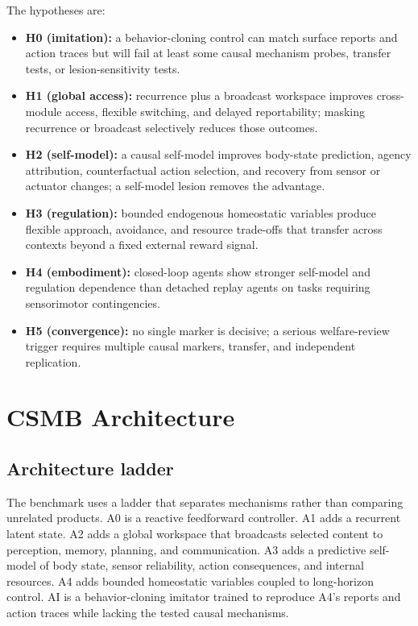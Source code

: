 \documentclass[conference]{IEEEtran}
\begin{document}
The hypotheses are:

\begin{itemize}
\item \textbf{H0 (imitation):} a behavior-cloning control can match surface reports and action traces but will fail at least some causal mechanism probes, transfer tests, or lesion-sensitivity tests.
\item \textbf{H1 (global access):} recurrence plus a broadcast workspace improves cross-module access, flexible switching, and delayed reportability; masking recurrence or broadcast selectively reduces those outcomes.
\item \textbf{H2 (self-model):} a causal self-model improves body-state prediction, agency attribution, counterfactual action selection, and recovery from sensor or actuator changes; a self-model lesion removes the advantage.
\item \textbf{H3 (regulation):} bounded endogenous homeostatic variables produce flexible approach, avoidance, and resource trade-offs that transfer across contexts beyond a fixed external reward signal.
\item \textbf{H4 (embodiment):} closed-loop agents show stronger self-model and regulation dependence than detached replay agents on tasks requiring sensorimotor contingencies.
\item \textbf{H5 (convergence):} no single marker is decisive; a serious welfare-review trigger requires multiple causal markers, transfer, and independent replication.
\end{itemize}

\section{CSMB Architecture}

\subsection{Architecture ladder}

The benchmark uses a ladder that separates mechanisms rather than comparing unrelated products. A0 is a reactive feedforward controller. A1 adds a recurrent latent state. A2 adds a global workspace that broadcasts selected content to perception, memory, planning, and communication. A3 adds a predictive self-model of body state, sensor reliability, action consequences, and internal resources. A4 adds bounded homeostatic variables coupled to long-horizon control. AI is a behavior-cloning imitator trained to reproduce A4's reports and action traces while lacking the tested causal mechanisms.
\end{document}
